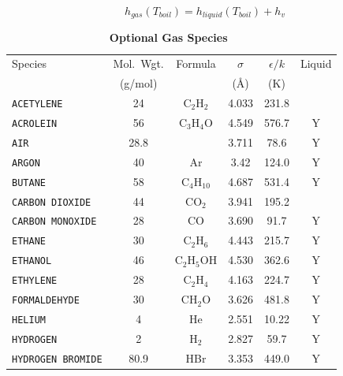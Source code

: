 \documentclass[11pt]{book}
\newcommand{\ct}{\tt\small}
\newcommand{\be}{\begin{equation}}
\newcommand{\ee}{\end{equation}}
\begin{document}
\be h_{gas}(T_{boil})=h_{liquid}(T_{boil})+h_v \ee

\begin{table}[ht]
\begin{center}
\caption[Optional Gas Species]{\bf Optional Gas Species~\cite{Reid:1}}
\label{tab:gasspecies}
\vspace{0.1in}
\begin{tabular}{|l|c|c|c|c|c|}
\hline
Species &   Mol.~Wgt.           & Formula          & $\sigma$ & $\epsilon/k$   & Liquid \\
        &   (g/mol)             &                  & (\AA)    & (K)            &        \\ \hline
\hline
{\ct ACETYLENE}          & 24   & C$_2$H$_2$       & 4.033    & 231.8           &        \\ \hline
{\ct ACROLEIN}           & 56   & C$_3$H$_4$O      & 4.549    & 576.7           &    Y   \\ \hline
{\ct AIR}                & 28.8 &                  & 3.711    & 78.6            &    Y   \\ \hline
{\ct ARGON}              & 40   & Ar               & 3.42     & 124.0           &    Y   \\ \hline
{\ct BUTANE}             & 58   & C$_4$H$_{10}$    & 4.687    & 531.4           &    Y   \\ \hline
{\ct CARBON DIOXIDE}     & 44   & CO$_2$           & 3.941    & 195.2           &        \\ \hline
{\ct CARBON MONOXIDE}    & 28   & CO               & 3.690    & 91.7            &    Y   \\ \hline
{\ct ETHANE}             & 30   & C$_2$H$_6$       & 4.443    & 215.7           &    Y   \\ \hline
{\ct ETHANOL}            & 46   & C$_2$H$_5$OH     & 4.530    & 362.6           &    Y   \\ \hline
{\ct ETHYLENE}           & 28   & C$_2$H$_4$ 	   & 4.163    & 224.7           &    Y   \\ \hline
{\ct FORMALDEHYDE}       & 30   & CH$_2$O          & 3.626    & 481.8           &    Y   \\ \hline
{\ct HELIUM}             & 4    & He               & 2.551    & 10.22           &    Y   \\ \hline
{\ct HYDROGEN}           & 2    & H$_2$            & 2.827    & 59.7            &    Y   \\ \hline
{\ct HYDROGEN BROMIDE}   & 80.9 & HBr              & 3.353    & 449.0           &    Y   \\ \hline

\end{tabular}
\end{center}
\end{table}
\end{document}
